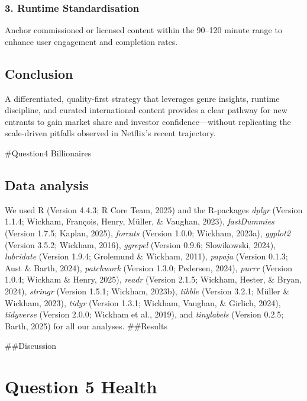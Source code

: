\documentclass[
  man,floatsintext]{apa6}
\begin{document}
\subsubsection{3. Runtime Standardisation}\label{runtime-standardisation}

Anchor commissioned or licensed content within the 90--120 minute range to enhance user engagement and completion rates.

\subsection{Conclusion}\label{conclusion}

A differentiated, quality-first strategy that leverages genre insights, runtime discipline, and curated international content provides a clear pathway for new entrants to gain market share and investor confidence---without replicating the scale-driven pitfalls observed in Netflix's recent trajectory.

\#Question4 Billionaires

\subsection{Data analysis}\label{data-analysis}

We used R (Version 4.4.3; R Core Team, 2025) and the R-packages \emph{dplyr} (Version 1.1.4; Wickham, François, Henry, Müller, \& Vaughan, 2023), \emph{fastDummies} (Version 1.7.5; Kaplan, 2025), \emph{forcats} (Version 1.0.0; Wickham, 2023a), \emph{ggplot2} (Version 3.5.2; Wickham, 2016), \emph{ggrepel} (Version 0.9.6; Slowikowski, 2024), \emph{lubridate} (Version 1.9.4; Grolemund \& Wickham, 2011), \emph{papaja} (Version 0.1.3; Aust \& Barth, 2024), \emph{patchwork} (Version 1.3.0; Pedersen, 2024), \emph{purrr} (Version 1.0.4; Wickham \& Henry, 2025), \emph{readr} (Version 2.1.5; Wickham, Hester, \& Bryan, 2024), \emph{stringr} (Version 1.5.1; Wickham, 2023b), \emph{tibble} (Version 3.2.1; Müller \& Wickham, 2023), \emph{tidyr} (Version 1.3.1; Wickham, Vaughan, \& Girlich, 2024), \emph{tidyverse} (Version 2.0.0; Wickham et al., 2019), and \emph{tinylabels} (Version 0.2.5; Barth, 2025) for all our analyses.
\#\#Results

\#\#Discussion

\section{Question 5 Health}\label{question-5-health}
\end{document}
